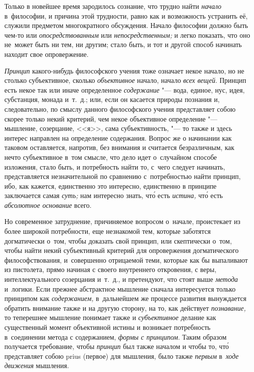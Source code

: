 Только в новейшее время зародилось сознание, что трудно найти {\em начало}
в~философии, и причина этой трудности,
равно как и возможность устранить её, служили предметом
многократного обсуждения. Начало философии должно быть чем-то или {\em
опосредствованным} или {\em непосредственным;} и легко показать, что оно
не~может быть ни тем, ни другим; стало быть, и тот и другой способ начинать
находит свое опровержение.

{\em Принцип} какого-нибудь философского учения тоже означает некое начало, но
не столько субъективное, сколько {\em объективное} начало, начало
{\em всех вещей}. Принцип есть некое так или иначе определенное
{\em содержание} "--- вода, единое, нус, идея, субстанция,
монада и~т.~д.; или, если он касается природы познания и, следовательно, по
смыслу данного философского учения представляет собою скорее только некий
критерий, чем некое объективное определение "--- мышление, созерцание, <<я>>,
сама субъективность, "--- то также и здесь интерес направлен на определение
содержания. Вопрос же о начинании как таковом оставляется, напротив, без
внимания и считается безразличным, как нечто субъективное в~том смысле, что
дело идет о~случайном способе изложения, стало быть, и потребность найти то,
с~чего следует начинать, представляется незначительной по сравнению
с~потребностью найти принцип, ибо, как кажется, единственно это интересно,
единственно в принципе заключается самая {\em суть;} нам интересно знать,
чт\'{о} есть {\em истина,} чт\'{о} есть {\em абсолютное основание} всего.

Но современное затруднение, причиняемое вопросом о~начале, проистекает из более
широкой потребности, еще незнакомой тем, которые заботятся догматически о~том,
чтобы доказать свой принцип, или скептически о~том, чтобы найти некий
субъективный критерий для опровержения догматического философствования,
и~совершенно отрицаемой теми, которые как бы выпаливают из пистолета, прямо
начиная с своего внутреннего откровения, с веры, интеллектуального созерцания
и~т.~д., и претендуют, что стоят выше {\em метода} и~логики. Если прежнее
абстрактное мышление сначала интересуется только принципом как
{\em содержанием,} в~дальнейшем же процессе развития вынуждается обратить
внимание также и на другую сторону, на то, как действует {\em познавание,}
то теперешнее мышление понимает также и {\em субъективное} делание как
существенный момент объективной истины и возникает потребность в~соединении
метода с содержанием, {\em формы с принципом}. Таким образом получается
требование, чтобы {\em принцип} был также началом и чтобы то, чт\'{о}
представляет собою prius (первое) для мышления, было также {\em первым}
в~{\em ходе движения} мышления.

